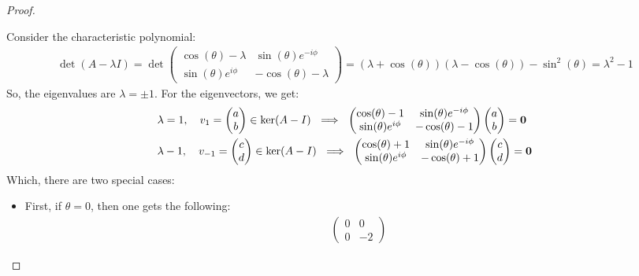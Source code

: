 \documentclass{article}
\begin{document}
\begin{proof}
\begin{itemize}
        Consider the characteristic polynomial:
        \begin{align}
            \det(A-\lambda I)=\det\begin{pmatrix}
                \cos(\theta)-\lambda & \sin(\theta)e^{-i\phi}\\
                \sin(\theta)e^{i\phi} & -\cos(\theta)-\lambda
            \end{pmatrix} = (\lambda+\cos(\theta))(\lambda-\cos(\theta)) - \sin^2(\theta) = \lambda^2-1
        \end{align}
        So, the eigenvalues are $\lambda = \pm 1$. For the eigenvectors, we get:
        \begin{align}
            &\lambda=1,\quad v_1=\begin{pmatrix}
                a\\b
            \end{pmatrix}\in\ker(A-I)\ \implies\ \begin{pmatrix}
                \cos(\theta)-1 & \sin(\theta)e^{-i\phi}\\
                \sin(\theta)e^{i\phi} & -\cos(\theta)-1
            \end{pmatrix}\begin{pmatrix}
                a\\b
            \end{pmatrix} = \mathbf{0}\\
            &\lambda-1,\quad v_{-1}=\begin{pmatrix}
                c\\d
            \end{pmatrix}\in\ker(A-I)\ \implies\ \begin{pmatrix}
                \cos(\theta)+1 & \sin(\theta)e^{-i\phi}\\
                \sin(\theta)e^{i\phi} & -\cos(\theta)+1
            \end{pmatrix}\begin{pmatrix}
                c\\d
            \end{pmatrix} = \mathbf{0}
        \end{align}
        Which, there are two special cases:
        \begin{itemize}
            \item First, if $\theta=0$, then one gets the following:
            \begin{align}
                &\begin{pmatrix}
                    0&0\\0&-2

\end{pmatrix}
\end{align}
\end{itemize}
\end{itemize}
\end{proof}
\end{document}
